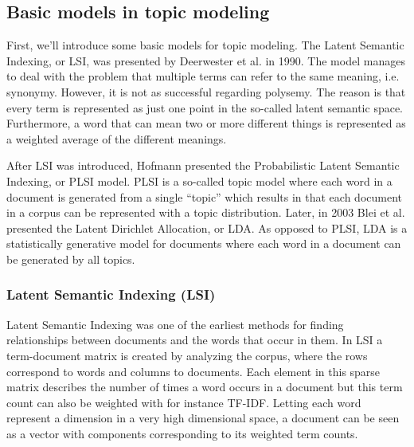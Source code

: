 \documentclass[12pt]{report}
\begin{document}
\vspace{10mm}
\subsection{Basic models in topic modeling}

\vspace{5mm}

First, we’ll introduce some basic models for topic modeling. The Latent Semantic Indexing, or LSI, was presented by Deerwester et al. in 1990. The model manages to deal with the problem that multiple terms can refer to the same meaning, i.e. synonymy. However, it is not as successful regarding polysemy. The reason is that every term is represented as just one
point in the so-called latent semantic space. Furthermore, a word that can mean two or more different things is represented as a weighted average of the different meanings.\par

\vspace{3mm}
 
After LSI was introduced, Hofmann presented the Probabilistic Latent Semantic Indexing, or PLSI model. PLSI is a so-called topic model where each word in a document is generated from a single “topic” which results in that each document in a corpus can be represented with a topic distribution. Later, in 2003 Blei et al. presented the Latent Dirichlet Allocation, or LDA.
As opposed to PLSI, LDA is a statistically generative model for documents where each word in a document can be generated by all topics.\par
\vspace{10mm}

\subsubsection{Latent Semantic Indexing (LSI)}

\vspace{5mm}

Latent Semantic Indexing was one of the earliest methods for finding relationships between documents and the words that occur in them. In LSI a term-document matrix is created by analyzing the corpus, where the rows correspond to words and columns to documents. Each element in this sparse matrix describes the number of times a word occurs in a document but this term count can also be weighted with for instance TF-IDF. Letting each word represent a dimension in a very high dimensional space, a document can be seen as a vector with components corresponding to its weighted term counts.\par
\end{document}
